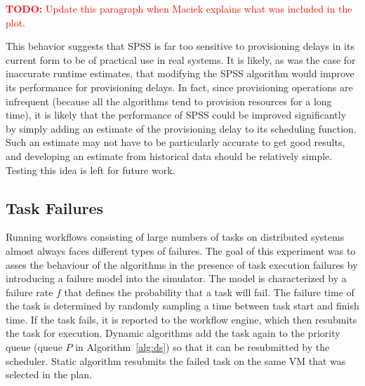 \documentclass[conference]{IEEEtran}
\newcommand{\TODO}[1]{
  {\Large \textcolor{red}{\textbf{TODO: }#1}}
}
\begin{document}
\TODO{Update this paragraph when Maciek explains what was included in the plot.}

This behavior suggests that SPSS is far too sensitive to provisioning delays in its current form to be of practical use in real systems. It is likely, as was the case for inaccurate runtime estimates, that modifying the SPSS algorithm would improve its performance for provisioning delays. In fact, since provisioning operations are infrequent (because all the algorithms tend to provision resources for a long time), it is likely that the performance of SPSS could be improved significantly by simply adding an estimate of the provisioning delay to its scheduling function. Such an estimate may not have to be particularly accurate to get good results, and developing an estimate from historical data should be relatively simple. Testing this idea is left for future work.


\subsection{Task Failures}
\label{sec:failures}

Running workflows consisting of large numbers of tasks on distributed systems
almost always faces different types of failures. The goal of this experiment was
to asses the behaviour of the algorithms in the presence of task execution
failures by introducing a failure model into the simulator. The model is
characterized by a failure rate $f$ that defines the probability that a task
will fail. The failure time of the task is determined by randomly sampling a
time between task start and finish time. If the task fails, it is reported to
the workflow engine, which then resubmits the task for execution. Dynamic algorithms
add the task again to the priority queue (queue $P$ in Algorithm~\ref{alg:ds})
so that it can be resubmitted by the scheduler. Static algorithm resubmits the
failed task on the same VM that was selected in the plan.
\end{document}
